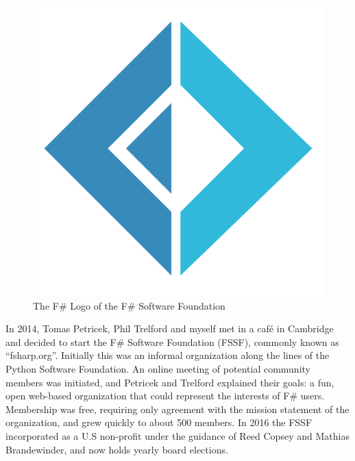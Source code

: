 \documentclass[acmsmall]{acmart}\settopmatter{}
\begin{document}
\begin{figure}
  \begin{center}
  \includegraphics[width=0.8\linewidth]{fsharp-logo.png}
  \end{center}
  \caption{The F\# Logo of the F\# Software Foundation}
  \label{fig:fsharp-logo}
\end{figure}

In 2014, Tomas Petricek, Phil Trelford and myself met in a café in Cambridge and decided to start the F\# Software
Foundation (FSSF), commonly known as “fsharp.org”.  Initially this was an informal organization along the lines of the Python
Software Foundation.  An online meeting of potential community members was initiated, and Petricek and Trelford explained
their goals: a fun, open web-based organization that could represent the interests of F\# users.  Membership was free,
requiring only agreement with the mission statement of the organization, and grew quickly to about 500 members.  In 2016 the
FSSF incorporated as a U.S non-profit under the guidance of Reed Copsey and Mathias Brandewinder, and now holds yearly board elections. 
\end{document}
